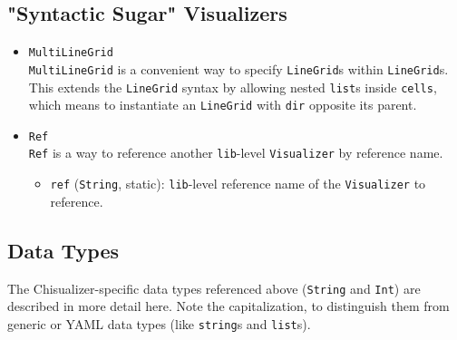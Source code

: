 \documentclass[11pt]{article}
\begin{document}
\subsection {"Syntactic Sugar" Visualizers}
\begin{itemize}
  \item \texttt{MultiLineGrid} \\
  \texttt{MultiLineGrid} is a convenient way to specify \texttt{LineGrid}s within \texttt{LineGrid}s. This extends the \texttt{LineGrid} syntax by allowing nested \texttt{list}s inside \texttt{cells}, which means to instantiate an \texttt{LineGrid} with \texttt{dir} opposite its parent.
  \item \texttt{Ref} \\
  \texttt{Ref} is a way to reference another \texttt{lib}-level \texttt{Visualizer} by reference name.
  \begin{itemize}
    \item \texttt{ref} (\texttt{String}, static): \texttt{lib}-level reference name of the \texttt{Visualizer} to reference.
  \end{itemize}
\end{itemize}

\subsection {Data Types}
The Chisualizer-specific data types referenced above (\texttt{String} and \texttt{Int}) are described in more detail here. Note the capitalization, to distinguish them from generic or YAML data types (like \texttt{string}s and \texttt{list}s).
\end{document}
